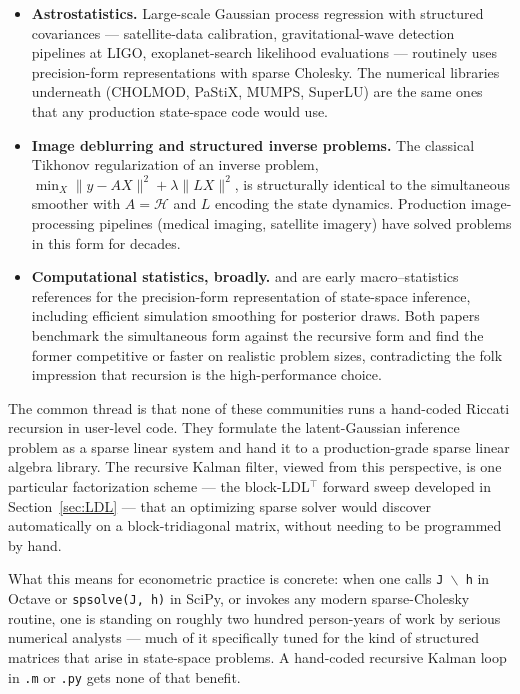 \documentclass[11pt]{article}
\begin{document}
\begin{itemize}[leftmargin=2em,itemsep=4pt]
\item \textbf{Astrostatistics.}  Large-scale Gaussian process
regression with structured covariances --- satellite-data
calibration, gravitational-wave detection pipelines at LIGO,
exoplanet-search likelihood evaluations --- routinely uses
precision-form representations with sparse Cholesky.  The numerical
libraries underneath (CHOLMOD, PaStiX, MUMPS, SuperLU) are the same
ones that any production state-space code would use.

\item \textbf{Image deblurring and structured inverse problems.}  The
classical Tikhonov regularization of an inverse problem,
$\min_X \|y-AX\|^2 + \lambda \|LX\|^2$, is structurally identical
to the simultaneous smoother with $A=\mathcal H$ and $L$ encoding
the state dynamics.  Production image-processing pipelines (medical
imaging, satellite imagery) have solved problems in this form for
decades.

\item \textbf{Computational statistics, broadly.}
\citet{ChanJeliazkov2009} and \citet{McCauslandMillerPelletier2011}
are early macro--statistics references for the precision-form
representation of state-space inference, including efficient
simulation smoothing for posterior draws.  Both papers benchmark
the simultaneous form against the recursive form and find the
former competitive or faster on realistic problem sizes,
contradicting the folk impression that recursion is the
high-performance choice.

\end{itemize}

The common thread is that none of these communities runs a
hand-coded Riccati recursion in user-level code.  They formulate
the latent-Gaussian inference problem as a sparse linear system and
hand it to a production-grade sparse linear algebra library.  The
recursive Kalman filter, viewed from this perspective, is one
particular factorization scheme --- the block-LDL$^{\top}$ forward
sweep developed in Section~\ref{sec:LDL} --- that an
optimizing sparse solver would discover automatically on a
block-tridiagonal matrix, without needing to be programmed by hand.

What this means for econometric practice is concrete: when one
calls \texttt{J $\backslash$ h} in Octave or \texttt{spsolve(J,\,h)}
in SciPy, or invokes any modern sparse-Cholesky routine, one is
standing on roughly two hundred person-years of work by serious
numerical analysts --- much of it specifically tuned for the kind
of structured matrices that arise in state-space problems.  A
hand-coded recursive Kalman loop in \texttt{.m} or \texttt{.py}
gets none of that benefit.
\end{document}
